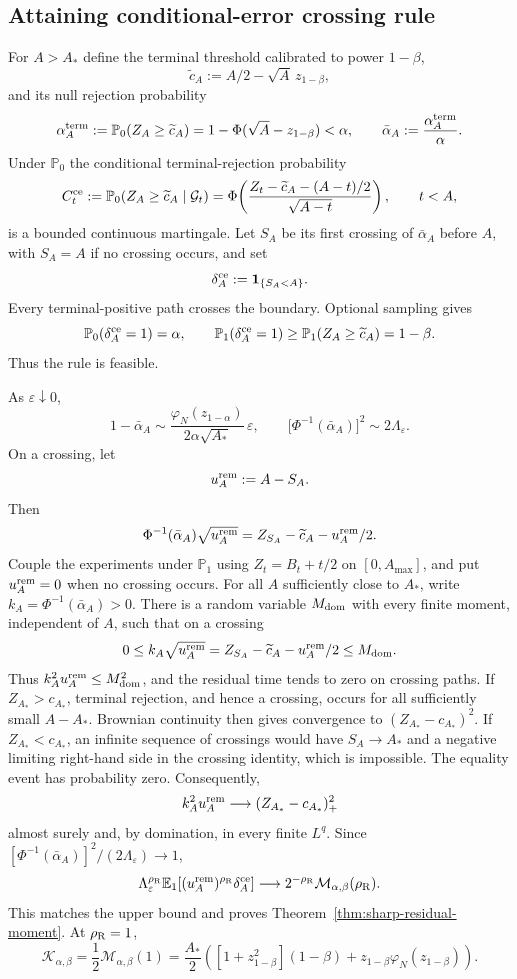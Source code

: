 \documentclass[11pt]{article}
\numberwithin{equation}{section}
\theoremstyle{plain}
\theoremstyle{definition}
\theoremstyle{remark}
\newcommand{\Pzero}{\mathbb P_0}
\newcommand{\Pone}{\mathbb P_1}
\newcommand{\Eone}{\mathbb E_1}
\begin{document}
\subsection{Attaining conditional-error crossing rule}

For $A>A_*$ define the terminal threshold calibrated to power $1-\beta$,
\[
\widetilde c_A:=A/2-\sqrt A\,z_{1-\beta},
\]
and its null rejection probability
\[
\alpha_A^{\rm term}
:=\Pzero(Z_A\ge\widetilde c_A)
=1-\Phi(\sqrt A-z_{1-\beta})<\alpha,
\qquad
\bar\alpha_A:=\frac{\alpha_A^{\rm term}}{\alpha}.
\]
Under $\Pzero$ the conditional terminal-rejection probability
\[
C_t^{\rm ce}
:=\Pzero(Z_A\ge\widetilde c_A\mid\mathcal G_t)
=
\Phi\!\left(
\frac{Z_t-\widetilde c_A-(A-t)/2}{\sqrt{A-t}}
\right),
\qquad t<A,
\]
is a bounded continuous martingale. Let $S_A$ be its first crossing of $\bar\alpha_A$ before $A$, with $S_A=A$ if no crossing occurs, and set
\[
\delta_A^{\rm ce}:=\mathbf1_{\{S_A<A\}}.
\]
Every terminal-positive path crosses the boundary. Optional sampling gives
\[
\Pzero(\delta_A^{\rm ce}=1)=\alpha,
\qquad
\Pone(\delta_A^{\rm ce}=1)
\ge\Pone(Z_A\ge\widetilde c_A)=1-\beta.
\]
Thus the rule is feasible.

As $\varepsilon\downarrow0$,
\[
1-\bar\alpha_A
\sim
\frac{\varphi_N(z_{1-\alpha})}{2\alpha\sqrt{A_*}}\,\varepsilon,
\qquad
\bigl[\Phi^{-1}(\bar\alpha_A)\bigr]^2
\sim2\Lambda_\varepsilon.
\]
On a crossing, let
\[
u_A^{\rm rem}:=A-S_A.
\]
Then
\[
\Phi^{-1}(\bar\alpha_A)\sqrt{u_A^{\rm rem}}
=Z_{S_A}-\widetilde c_A-u_A^{\rm rem}/2.
\]
Couple the experiments under $\mathbb P_1$ using $Z_t=B_t+t/2$ on
$[0,A_{\max}]$, and put $u_A^{\rm rem}=0$ when no crossing occurs. For all
$A$ sufficiently close to $A_*$, write
$k_A=\Phi^{-1}(\bar\alpha_A)>0$. There is a random variable $M_{\rm dom}$
with every finite moment, independent of $A$, such that on a crossing
\[
0\le k_A\sqrt{u_A^{\rm rem}}
=Z_{S_A}-\widetilde c_A-u_A^{\rm rem}/2\le M_{\rm dom}.
\]
Thus $k_A^2u_A^{\rm rem}\le M_{\rm dom}^2$, and the residual time tends to
zero on crossing paths. If $Z_{A_*}>c_{A_*}$, terminal rejection, and hence
a crossing, occurs for all sufficiently small $A-A_*$. Brownian continuity
then gives convergence to $(Z_{A_*}-c_{A_*})^2$. If $Z_{A_*}<c_{A_*}$, an
infinite sequence of crossings would have $S_A\to A_*$ and a negative
limiting right-hand side in the crossing identity, which is impossible.
The equality event has probability zero. Consequently,
\[
k_A^2u_A^{\rm rem}\longrightarrow (Z_{A_*}-c_{A_*})_+^2
\]
almost surely and, by domination, in every finite $L^q$. Since
$[\Phi^{-1}(\bar\alpha_A)]^2/(2\Lambda_\varepsilon)\to1$,
\[
\Lambda_\varepsilon^{\rho_{\rm R}}
\Eone[(u_A^{\rm rem})^{\rho_{\rm R}}\delta_A^{\rm ce}]
\longrightarrow
2^{-\rho_{\rm R}}\mathcal M_{\alpha,\beta}(\rho_{\rm R}).
\]
This matches the upper bound and proves Theorem~\ref{thm:sharp-residual-moment}. At $\rho_{\rm R}=1$,
\[
\mathcal K_{\alpha,\beta}
=\frac12\mathcal M_{\alpha,\beta}(1)
=\frac{A_*}{2}
\left(
[1+z_{1-\beta}^2](1-\beta)
+z_{1-\beta}\varphi_N(z_{1-\beta})
\right).
\]
\end{document}
